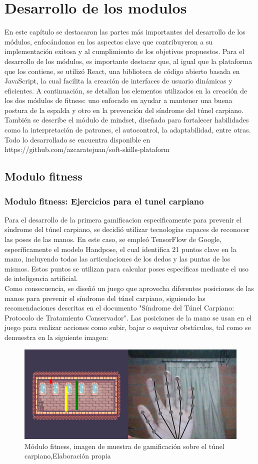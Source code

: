 
\section{Desarrollo de los modulos}
En este capítulo se destacaron las partes más importantes del desarrollo de los módulos, enfocándonos en los aspectos clave que contribuyeron a su implementación exitosa y al cumplimiento de los objetivos propuestos.
Para el desarrollo de los módulos, es importante destacar que, al igual que la plataforma que los contiene, se utilizó React, una biblioteca de código abierto basada en JavaScript, la cual facilita la creación de interfaces de usuario dinámicas y eficientes. A continuación, se detallan los elementos utilizados en la creación de los dos módulos de fitness: uno enfocado en ayudar a mantener una buena postura de la espalda y otro en la prevención del síndrome del túnel carpiano. También se describe el módulo de mindset, diseñado para fortalecer habilidades como la interpretación de patrones, el autocontrol, la adaptabilidad, entre otras. Todo lo desarrollado se encuentra disponible en https://github.com/azcaratejuan/soft-skills-plataform \subsection{Modulo fitness}
\subsubsection{Modulo fitness: Ejercicios para el tunel carpiano}
Para el desarrollo de la primera gamificacion especificamente para prevenir el síndrome del túnel carpiano, se decidió utilizar tecnologías capaces de reconocer las poses de las manos. En este caso, se empleó TensorFlow de Google, específicamente el modelo Handpose, el cual identifica 21 puntos clave en la mano, incluyendo todas las articulaciones de los dedos y las puntas de los mismos. Estos puntos se utilizan para calcular poses específicas mediante el uso de inteligencia artificial.
\\
Como consecuencia, se diseñó un juego que aprovecha diferentes posiciones de las manos para prevenir el síndrome del túnel carpiano, siguiendo las recomendaciones descritas en el documento "Síndrome del Túnel Carpiano: Protocolo de Tratamiento Conservador"\cite{14_1}. Las posiciones de la mano se usan en el juego para realizar acciones como subir, bajar o esquivar obstáculos, tal como se demuestra en la siguiente imagen:
\begin{figure}[H]
  \centering
  \includegraphics[width=0.6\linewidth]{Imagenes/Fitness1.png}
  \caption{Módulo fitness, imagen de muestra de gamificación sobre el túnel carpiano,Elaboración propia}
  \label{fig:imagen1fitness}
\end{figure}


